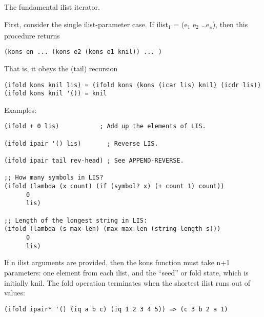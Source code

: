 \begin{entry}{%
  }

The fundamental ilist iterator.

  First, consider the single ilist-parameter case. If ilist$_1$ =
  (e$_1$ e$_2$ \ldots e\textsubscript{n}), then this procedure
  returns

  \texttt{(kons\ en\ ...\ (kons\ e2\ (kons\ e1\ knil))\ ...\ )}

  That is, it obeys the (tail) recursion

\begin{verbatim}
(ifold kons knil lis) = (ifold kons (kons (icar lis) knil) (icdr lis))
(ifold kons knil '()) = knil
\end{verbatim}

  Examples:

\begin{verbatim}
(ifold + 0 lis)           ; Add up the elements of LIS.

(ifold ipair '() lis)       ; Reverse LIS.

(ifold ipair tail rev-head) ; See APPEND-REVERSE.

;; How many symbols in LIS?
(ifold (lambda (x count) (if (symbol? x) (+ count 1) count))
      0
      lis)

;; Length of the longest string in LIS:
(ifold (lambda (s max-len) (max max-len (string-length s)))
      0
      lis)
\end{verbatim}

  If n ilist arguments are provided, then the kons function must take
  n+1 parameters: one element from each ilist, and the ``seed'' or
  fold state, which is initially knil. The fold operation terminates
  when the shortest ilist runs out of values:

\begin{verbatim}
(ifold ipair* '() (iq a b c) (iq 1 2 3 4 5)) => (c 3 b 2 a 1)
\end{verbatim}
\end{entry}

